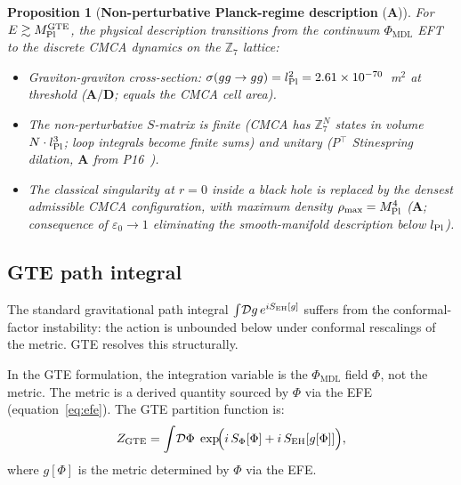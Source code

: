 \documentclass[11pt]{article}
\newtheorem{proposition}[theorem]{Proposition}
\theoremstyle{remark}
\newcommand{\PHIMDL}{\Phi_{\mathrm{MDL}}}
\newcommand{\ZS}{\mathbb{Z}_7}
\newcommand{\epsz}{\varepsilon_0}
\newcommand{\CatA}{\textbf{A}}
\newcommand{\CatAD}{\textbf{A/D}}
\begin{document}
\begin{proposition}[\textbf{Non-perturbative Planck-regime description} ($\CatA$)]
\label{prop:npg}
For $E \gtrsim M_{\rm Pl}^{\rm GTE}$, the physical description transitions from
the continuum $\PHIMDL$ EFT to the discrete CMCA dynamics on the $\ZS$ lattice:
\begin{itemize}[noitemsep]
\item Graviton-graviton cross-section: $\sigma(gg\to gg)=l_{\rm Pl}^2
  =2.61\times10^{-70}$~m$^2$ at threshold ($\CatAD$; equals the CMCA cell area).
\item The non-perturbative $S$-matrix is finite (CMCA has $\ZS^N$ states in
  volume $N\cdot l_{\rm Pl}^3$; loop integrals become finite sums) and unitary
  (P$^\top$ Stinespring dilation, $\CatA$ from P16~\cite{SpivackBHUnitarity}).
\item The classical singularity at $r=0$ inside a black hole is replaced by the
  densest admissible CMCA configuration, with maximum density $\rho_{\rm max}
  = M_{\rm Pl}^4$ ($\CatA$; consequence of $\epsz\to1$ eliminating the
  smooth-manifold description below $l_{\rm Pl}$).
\end{itemize}
\end{proposition}

\subsection{GTE path integral}

The standard gravitational path integral $\int\!\mathcal{D}g\,e^{iS_{\rm EH}[g]}$
suffers from the conformal-factor instability: the action is unbounded below
under conformal rescalings of the metric.  GTE resolves this structurally.

In the GTE formulation, the integration variable is the $\PHIMDL$ field $\Phi$,
not the metric.  The metric is a derived quantity sourced by $\Phi$ via the
EFE (equation~\eqref{eq:efe}).  The GTE partition function is:
\begin{equation}
  Z_{\rm GTE}
  = \int\!\mathcal{D}\Phi\;
    \exp\!\Bigl(i\,S_\Phi[\Phi] + i\,S_{\rm EH}[g[\Phi]]\Bigr),
  \label{eq:gte_path_integral}
\end{equation}
where $g[\Phi]$ is the metric determined by $\Phi$ via the EFE.
\end{document}
